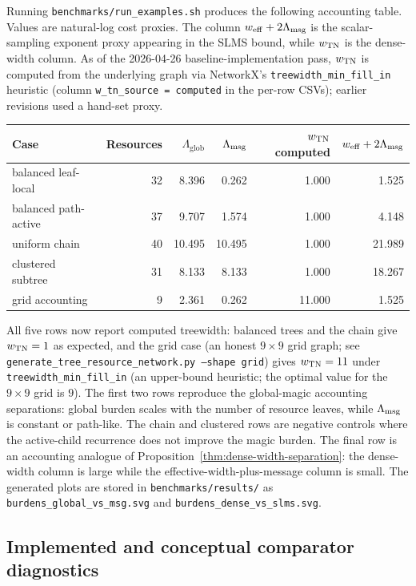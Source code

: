 Running \texttt{benchmarks/run\_examples.sh} produces the following accounting table. Values are natural-log cost proxies. The column \(w_{\mathrm{eff}}+2\Lambda_{\mathrm{msg}}\) is the scalar-sampling exponent proxy appearing in the SLMS bound, while \(w_{\mathrm{TN}}\) is the dense-width column. As of the 2026-04-26 baseline-implementation pass, \(w_{\mathrm{TN}}\) is computed from the underlying graph via NetworkX's \texttt{treewidth\_min\_fill\_in} heuristic (column \texttt{w\_tn\_source = computed} in the per-row CSVs); earlier revisions used a hand-set proxy.

\begin{center}
\small
\begin{tabular}{lrrrrr}
\toprule
Case & Resources & \(\Lambda_{\mathrm{glob}}\) & \(\Lambda_{\mathrm{msg}}\) & \(w_{\mathrm{TN}}\) computed & \(w_{\mathrm{eff}}+2\Lambda_{\mathrm{msg}}\) \\
\midrule
balanced leaf-local & 32 & 8.396 & 0.262 & 1.000 & 1.525 \\
balanced path-active & 37 & 9.707 & 1.574 & 1.000 & 4.148 \\
uniform chain & 40 & 10.495 & 10.495 & 1.000 & 21.989 \\
clustered subtree & 31 & 8.133 & 8.133 & 1.000 & 18.267 \\
grid accounting & 9 & 2.361 & 0.262 & 11.000 & 1.525 \\
\bottomrule
\end{tabular}
\end{center}

All five rows now report computed treewidth: balanced trees and the chain give \(w_{\mathrm{TN}}=1\) as expected, and the grid case (an honest \(9\times 9\) grid graph; see \texttt{generate\_tree\_resource\_network.py --shape grid}) gives \(w_{\mathrm{TN}}=11\) under \texttt{treewidth\_min\_fill\_in} (an upper-bound heuristic; the optimal value for the \(9\times 9\) grid is \(9\)). The first two rows reproduce the global-magic accounting separations: global burden scales with the number of resource leaves, while \(\Lambda_{\mathrm{msg}}\) is constant or path-like. The chain and clustered rows are negative controls where the active-child recurrence does not improve the magic burden. The final row is an accounting analogue of Proposition~\ref{thm:dense-width-separation}: the dense-width column is large while the effective-width-plus-message column is small. The generated plots are stored in \texttt{benchmarks/results/} as \texttt{burdens\_global\_vs\_msg.svg} and \texttt{burdens\_dense\_vs\_slms.svg}.

\subsection{Implemented and conceptual comparator diagnostics}

